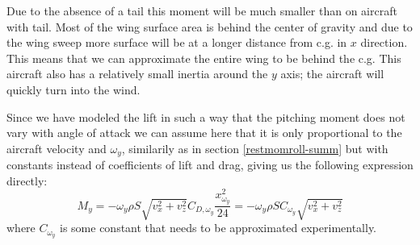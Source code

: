 Due to the absence of a tail this moment will be much smaller than on aircraft with tail.
Most of the wing surface area is behind the center of gravity and due to the wing sweep more surface will be at a longer distance from c.g. in $x$ direction.
This means that we can approximate the entire wing to be behind the c.g.
This aircraft also has a relatively small inertia around the $y$ axis; the aircraft will quickly turn into the wind.

Since we have modeled the lift in such a way that the pitching moment does not vary with angle of attack we can assume here that it is only proportional to the aircraft velocity and $\omega_y$, similarily as in section \ref{restmomroll-summ} but with constants instead of coefficients of lift and drag, giving us the following expression directly:
\begin{equation}
    M_y = -\omega_y \rho S \sqrt{v_x^2 + v_z^2} C_{D,\omega_y} \frac{x_{\omega_y}^2}{24}
    =
    -\omega_y \rho S C_{\omega_y} \sqrt{v_x^2 + v_z^2}
\end{equation}
where $C_{\omega_y}$ is some constant that needs to be approximated experimentally.

